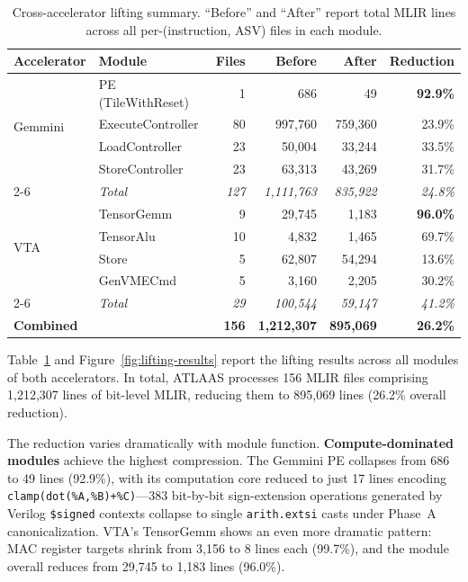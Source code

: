 \begin{table}[t]
\centering
\caption{Cross-accelerator lifting summary. ``Before'' and ``After'' report total MLIR lines across all per-(instruction, ASV) files in each module.}
\label{tab:lifting-summary}
\setlength{\tabcolsep}{3pt}
\scriptsize
\begin{tabular}{@{}ll r r r r@{}}
\toprule
Accelerator & Module & Files & Before & After & Reduction \\
\midrule
\multirow{4}{*}{Gemmini}
  & PE (TileWithReset) & 1    &     686 &      49 & \textbf{92.9\%} \\
  & ExecuteController  & 80   & 997{,}760 & 759{,}360 & 23.9\% \\
  & LoadController     & 23   &  50{,}004 &  33{,}244 & 33.5\% \\
  & StoreController    & 23   &  63{,}313 &  43{,}269 & 31.7\% \\
\cmidrule{2-6}
  & \textit{Total}     & \textit{127} & \textit{1{,}111{,}763} & \textit{835{,}922} & \textit{24.8\%} \\
\midrule
\multirow{4}{*}{VTA}
  & TensorGemm  &  9 & 29{,}745 &  1{,}183 & \textbf{96.0\%} \\
  & TensorAlu   & 10 &  4{,}832 &  1{,}465 & 69.7\% \\
  & Store       &  5 & 62{,}807 & 54{,}294 & 13.6\% \\
  & GenVMECmd   &  5 &  3{,}160 &  2{,}205 & 30.2\% \\
\cmidrule{2-6}
  & \textit{Total} & \textit{29} & \textit{100{,}544} & \textit{59{,}147} & \textit{41.2\%} \\
\midrule
\textbf{Combined} & & \textbf{156} & \textbf{1{,}212{,}307} & \textbf{895{,}069} & \textbf{26.2\%} \\
\bottomrule
\end{tabular}
\end{table}

Table~\ref{tab:lifting-summary} and Figure~\ref{fig:lifting-results} report the lifting results across all modules of both accelerators.
In total, ATLAAS processes 156 MLIR files comprising 1{,}212{,}307 lines of bit-level MLIR, reducing them to 895{,}069 lines (26.2\% overall reduction).

The reduction varies dramatically with module function.
\textbf{Compute-dominated modules} achieve the highest compression.
The Gemmini PE collapses from 686 to 49 lines (92.9\%), with its computation core reduced to just 17 lines encoding \texttt{clamp(dot(\%A,\%B)+\%C)}---383 bit-by-bit sign-extension operations generated by Verilog \texttt{\$signed} contexts collapse to single \texttt{arith.extsi} casts under Phase~A canonicalization.
VTA's TensorGemm shows an even more dramatic pattern: MAC register targets shrink from 3{,}156 to 8 lines each (99.7\%), and the module overall reduces from 29{,}745 to 1{,}183 lines (96.0\%).

